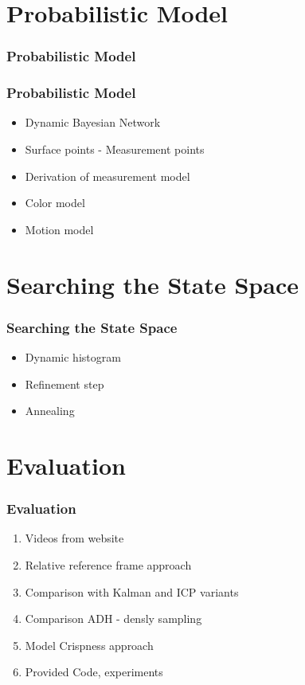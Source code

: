 \section{Probabilistic Model}

\begin{frame}
  \frametitle{Probabilistic Model}      
  
\end{frame}

\begin{frame}
  \frametitle{Probabilistic Model}
  \begin{itemize}
  \item Dynamic Bayesian Network
  \item Surface points - Measurement points
  \item Derivation of measurement model
  \item Color model
  \item Motion model
  \end{itemize}
\end{frame}

\section{Searching the State Space}
\begin{frame}
  \frametitle{Searching the State Space}
  \begin{itemize}
  \item Dynamic histogram
  \item Refinement step
  \item Annealing
  \end{itemize}
\end{frame}

\section{Evaluation}
\begin{frame}
  \frametitle{Evaluation}
  \begin{enumerate}
  \item Videos from website
  \item Relative reference frame approach
  \item Comparison with Kalman and ICP variants
  \item Comparison ADH - densly sampling
  \item Model Crispness approach
  \item Provided Code, experiments
  \end{enumerate}
\end{frame}


